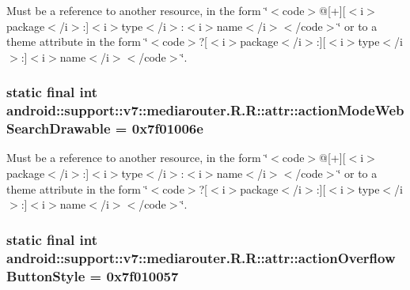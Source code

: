 Must be a reference to another resource, in the form \char`\"{}$<$code$>$@\mbox{[}+\mbox{]}\mbox{[}$<$i$>$package$<$/i$>$:\mbox{]}$<$i$>$type$<$/i$>$:$<$i$>$name$<$/i$>$$<$/code$>$\char`\"{} or to a theme attribute in the form \char`\"{}$<$code$>$?\mbox{[}$<$i$>$package$<$/i$>$:\mbox{]}\mbox{[}$<$i$>$type$<$/i$>$:\mbox{]}$<$i$>$name$<$/i$>$$<$/code$>$\char`\"{}. \hypertarget{classandroid_1_1support_1_1v7_1_1mediarouter_1_1_r_1_1attr_8a5a78506714d7dff157caedc955751c}{
\subsubsection[{actionModeWebSearchDrawable}]{\setlength{\rightskip}{0pt plus 5cm}static final int android::support::v7::mediarouter.R.R::attr::actionModeWebSearchDrawable = 0x7f01006e}}
\label{classandroid_1_1support_1_1v7_1_1mediarouter_1_1_r_1_1attr_8a5a78506714d7dff157caedc955751c}


Must be a reference to another resource, in the form \char`\"{}$<$code$>$@\mbox{[}+\mbox{]}\mbox{[}$<$i$>$package$<$/i$>$:\mbox{]}$<$i$>$type$<$/i$>$:$<$i$>$name$<$/i$>$$<$/code$>$\char`\"{} or to a theme attribute in the form \char`\"{}$<$code$>$?\mbox{[}$<$i$>$package$<$/i$>$:\mbox{]}\mbox{[}$<$i$>$type$<$/i$>$:\mbox{]}$<$i$>$name$<$/i$>$$<$/code$>$\char`\"{}. \hypertarget{classandroid_1_1support_1_1v7_1_1mediarouter_1_1_r_1_1attr_08ca29ac9608b9813f1599a7392346a7}{
\subsubsection[{actionOverflowButtonStyle}]{\setlength{\rightskip}{0pt plus 5cm}static final int android::support::v7::mediarouter.R.R::attr::actionOverflowButtonStyle = 0x7f010057}}
\label{classandroid_1_1support_1_1v7_1_1mediarouter_1_1_r_1_1attr_08ca29ac9608b9813f1599a7392346a7}


